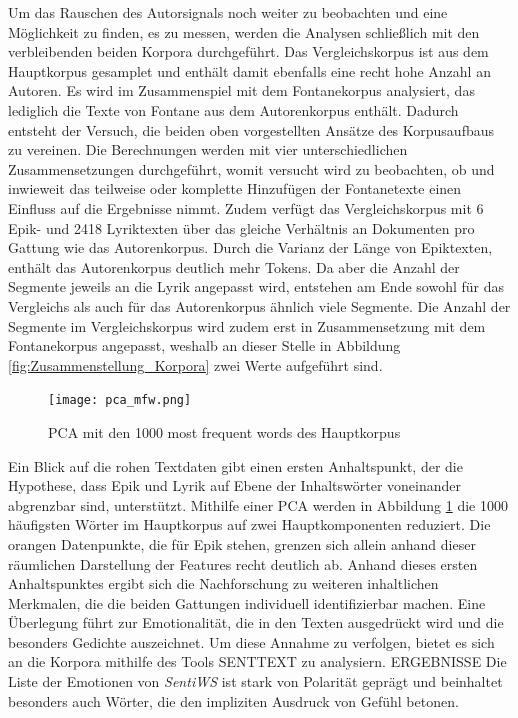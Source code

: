 \documentclass[a4paper,10p]{article}
\begin{document}
Um das Rauschen des Autorsignals noch weiter zu beobachten und eine Möglichkeit zu finden, es zu messen, werden die Analysen schließlich mit den verbleibenden beiden Korpora durchgeführt. Das Vergleichskorpus ist aus dem Hauptkorpus gesamplet und enthält damit ebenfalls eine recht hohe Anzahl an Autoren. Es wird im Zusammenspiel mit dem Fontanekorpus analysiert, das lediglich die Texte von Fontane aus dem Autorenkorpus enthält. Dadurch entsteht der Versuch, die beiden oben vorgestellten Ansätze des Korpusaufbaus zu vereinen. Die Berechnungen werden mit vier unterschiedlichen Zusammensetzungen durchgeführt, womit versucht wird zu beobachten, ob und inwieweit das teilweise oder komplette Hinzufügen der Fontanetexte einen Einfluss auf die Ergebnisse nimmt. Zudem verfügt das Vergleichskorpus mit 6 Epik- und 2418 Lyriktexten über das gleiche Verhältnis an Dokumenten pro Gattung wie das Autorenkorpus. Durch die Varianz der Länge von Epiktexten, enthält das Autorenkorpus deutlich mehr Tokens. Da aber die Anzahl der Segmente jeweils an die Lyrik angepasst wird, entstehen am Ende sowohl für das Vergleichs als auch für das Autorenkorpus ähnlich viele Segmente. Die Anzahl der Segmente im Vergleichskorpus wird zudem erst in Zusammensetzung mit dem Fontanekorpus angepasst, weshalb an dieser Stelle in Abbildung \ref{fig:Zusammenstellung_Korpora} zwei Werte aufgeführt sind. \par

\begin{figure}
	\texttt{[image: pca\_mfw.png]}
	\caption{PCA mit den 1000 most frequent words des Hauptkorpus}
	\label{fig:PCA_mfw}
\end{figure}

Ein Blick auf die rohen Textdaten gibt einen ersten Anhaltspunkt, der die Hypothese, dass Epik und Lyrik auf Ebene der Inhaltswörter voneinander abgrenzbar sind, unterstützt. Mithilfe einer PCA werden in Abbildung \ref{fig:PCA_mfw} die 1000 häufigsten Wörter im Hauptkorpus auf zwei Hauptkomponenten reduziert. Die orangen Datenpunkte, die für Epik stehen, grenzen sich allein anhand dieser räumlichen Darstellung der Features recht deutlich ab. Anhand dieses ersten Anhaltspunktes ergibt sich die Nachforschung zu weiteren inhaltlichen Merkmalen, die die beiden Gattungen individuell identifizierbar machen. Eine Überlegung führt zur Emotionalität, die in den Texten ausgedrückt wird und die besonders Gedichte auszeichnet. Um diese Annahme zu verfolgen, bietet es sich an die Korpora mithilfe des Tools SENTTEXT zu analysiern. ERGEBNISSE Die Liste der Emotionen von \textit{SentiWS} \citep{Sentiws} ist stark von Polarität geprägt und beinhaltet besonders auch Wörter, die den impliziten Ausdruck von Gefühl betonen. \par 
\end{document}
